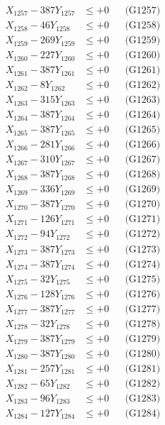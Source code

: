 \documentclass[a4paper,10pt]{article}
\begin{document}
{\begin{align}
X_{1257} - 387Y_{1257} &\leq +0 && \text{(G1257)} \\
X_{1258} - 46Y_{1258} &\leq +0 && \text{(G1258)} \\
X_{1259} - 269Y_{1259} &\leq +0 && \text{(G1259)} \\
X_{1260} - 227Y_{1260} &\leq +0 && \text{(G1260)} \\
\allowbreak
X_{1261} - 387Y_{1261} &\leq +0 && \text{(G1261)} \\
X_{1262} - 8Y_{1262} &\leq +0 && \text{(G1262)} \\
X_{1263} - 315Y_{1263} &\leq +0 && \text{(G1263)} \\
X_{1264} - 387Y_{1264} &\leq +0 && \text{(G1264)} \\
X_{1265} - 387Y_{1265} &\leq +0 && \text{(G1265)} \\
X_{1266} - 281Y_{1266} &\leq +0 && \text{(G1266)} \\
X_{1267} - 310Y_{1267} &\leq +0 && \text{(G1267)} \\
X_{1268} - 387Y_{1268} &\leq +0 && \text{(G1268)} \\
X_{1269} - 336Y_{1269} &\leq +0 && \text{(G1269)} \\
X_{1270} - 387Y_{1270} &\leq +0 && \text{(G1270)} \\
\allowbreak
X_{1271} - 126Y_{1271} &\leq +0 && \text{(G1271)} \\
X_{1272} - 94Y_{1272} &\leq +0 && \text{(G1272)} \\
X_{1273} - 387Y_{1273} &\leq +0 && \text{(G1273)} \\
X_{1274} - 387Y_{1274} &\leq +0 && \text{(G1274)} \\
X_{1275} - 32Y_{1275} &\leq +0 && \text{(G1275)} \\
X_{1276} - 128Y_{1276} &\leq +0 && \text{(G1276)} \\
X_{1277} - 387Y_{1277} &\leq +0 && \text{(G1277)} \\
X_{1278} - 32Y_{1278} &\leq +0 && \text{(G1278)} \\
X_{1279} - 387Y_{1279} &\leq +0 && \text{(G1279)} \\
X_{1280} - 387Y_{1280} &\leq +0 && \text{(G1280)} \\
\allowbreak
X_{1281} - 257Y_{1281} &\leq +0 && \text{(G1281)} \\
X_{1282} - 65Y_{1282} &\leq +0 && \text{(G1282)} \\
X_{1283} - 96Y_{1283} &\leq +0 && \text{(G1283)} \\
X_{1284} - 127Y_{1284} &\leq +0 && \text{(G1284)} \\

\end{align}}
\end{document}
